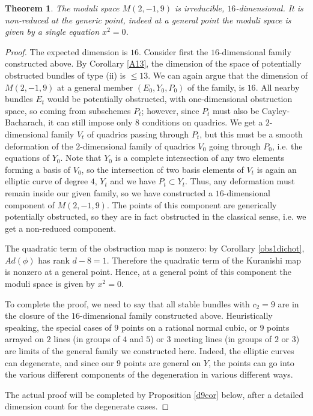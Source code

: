 \documentclass{amsart}
\theoremstyle{plain}
\newtheorem{theorem}{Theorem}[section]
\numberwithin{equation}{section}
\begin{document}
\begin{theorem}
\label{only9}
The moduli space $M (2,-1,9)$ is irreducible, $16$-dimensional. It is non-reduced
at the generic point, indeed at a general point
the moduli space is given by a single equation $x^2=0$.
\end{theorem}
\begin{proof}
The expected dimension is $16$. 
Consider first the $16$-dimensional family constructed above.
By Corollary \ref{A13}, the dimension of the space of potentially obstructed bundles 
of type (ii) is $\leq 13$. 
We can again argue that the dimension of $M (2,-1,9)$
at a general member $(E_0 , Y_0, P_0)$ of the family, is $16$. 
All nearby bundles $E_t$ would be potentially obstructed,
with one-dimensional obstruction space, so coming from subschemes $P_t$;
however, since $P_t$ must also be Cayley-Bacharach, it can still impose only
$8$ conditions on quadrics. We get a $2$-dimensional family $V_t$ of quadrics passing
through $P_t$, but this must be a smooth deformation of the $2$-dimensional family
of quadrics $V_0$ going through $P_0$, i.e. the equations of $Y_0$. Note that $Y_0$
is a complete intersection of any two elements forming a basis of $V_0$,
so the intersection of two basis elements of $V_t$ is again an elliptic curve of degree $4$,
$Y_t$ and we have $P_t\subset Y_t$. Thus, any deformation must remain inside our
given family, so we have constructed a $16$-dimensional component of
$M (2,-1,9)$. The points of this component are generically potentially obstructed, so 
they are in fact obstructed in the classical sense, i.e. we get a
non-reduced component. 

The quadratic term of the obstruction
map is nonzero: by Corollary \ref{obs1dichot},
$Ad(\phi )$
has rank $d-8=1$. Therefore the quadratic term
of the Kuranishi map is nonzero at a general point. Hence, at a general point
of this component the moduli space is given by $x^2=0$. 

To complete the proof, we need to say that all stable bundles 
with $c_2=9$ are in the closure of the $16$-dimensional
family constructed above.
Heuristically speaking, 
the special cases of $9$ points on a rational normal cubic, or $9$ points
arrayed on $2$ lines (in groups of $4$ and $5$) or $3$ meeting lines (in groups of $2$ or
$3$) are limits  of the general family we constructed here. Indeed, the elliptic curves
can degenerate, and since our $9$ points are general on $Y$, the points can go into
the various different components of the degeneration in various different ways.

The actual proof will be completed by Proposition \ref{d9cor} below, after a
detailed dimension count for the degenerate cases.
\end{proof}
\end{document}
